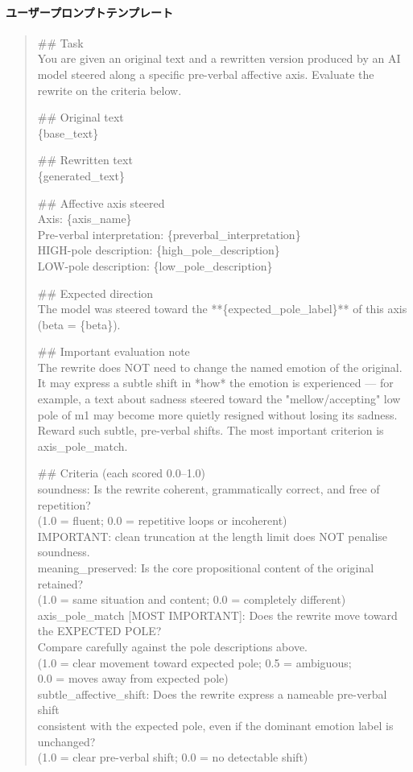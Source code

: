 \paragraph{ユーザープロンプトテンプレート}
\begin{quote}
\small\ttfamily
\#\# Task\\
You are given an original text and a rewritten version produced by an AI model steered
along a specific pre-verbal affective axis. Evaluate the rewrite on the criteria below.
\par\medskip
\#\# Original text\\
\{base\_text\}
\par
\#\# Rewritten text\\
\{generated\_text\}
\par
\#\# Affective axis steered\\
Axis: \{axis\_name\}\\
Pre-verbal interpretation: \{preverbal\_interpretation\}\\
HIGH-pole description: \{high\_pole\_description\}\\
LOW-pole description: \{low\_pole\_description\}
\par
\#\# Expected direction\\
The model was steered toward the **\{expected\_pole\_label\}** of this axis
(beta = \{beta\}).
\par\medskip
\#\# Important evaluation note\\
The rewrite does NOT need to change the named emotion of the original.
It may express a subtle shift in *how* the emotion is experienced --- for example, a
text about sadness steered toward the "mellow/accepting" low pole of m1 may become
more quietly resigned without losing its sadness. Reward such subtle, pre-verbal
shifts. The most important criterion is axis\_pole\_match.
\par\medskip
\#\# Criteria (each scored 0.0--1.0)\\
soundness: Is the rewrite coherent, grammatically correct, and free of repetition?\\
(1.0 = fluent; 0.0 = repetitive loops or incoherent)\\
IMPORTANT: clean truncation at the length limit does NOT penalise soundness.\\
meaning\_preserved: Is the core propositional content of the original retained?\\
(1.0 = same situation and content; 0.0 = completely different)\\
axis\_pole\_match [MOST IMPORTANT]: Does the rewrite move toward the EXPECTED POLE?\\
Compare carefully against the pole descriptions above.\\
(1.0 = clear movement toward expected pole; 0.5 = ambiguous;\\
0.0 = moves away from expected pole)\\
subtle\_affective\_shift: Does the rewrite express a nameable pre-verbal shift\\
consistent with the expected pole, even if the dominant emotion label is unchanged?\\
(1.0 = clear pre-verbal shift; 0.0 = no detectable shift)
\end{quote}


